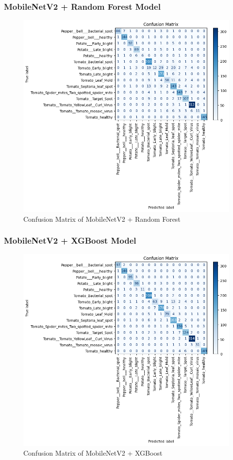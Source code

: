 \subsubsection{MobileNetV2 + Random Forest Model}
\begin{figure}
    \centering
    \includegraphics[width=1\linewidth]{graphics//chapter6/cm random forest.png}
    \caption{Confusion Matrix of MobileNetV2 + Random Forest}
    \label{fig:cm-xgboost}
\end{figure}

\subsubsection{MobileNetV2 + XGBoost Model}

\begin{figure}
    \centering
    \includegraphics[width=1\linewidth]{graphics//chapter6/cm xgboost.png}
    \caption{Confusion Matrix of MobileNetV2 + XGBoost}
    \label{fig:cm-xgboost}
\end{figure}

